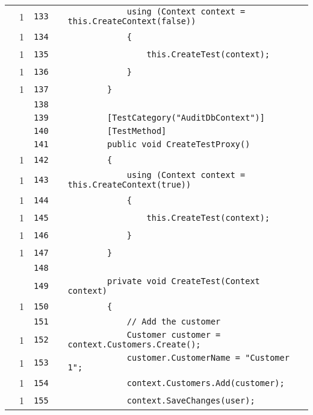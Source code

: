 \documentclass[a4paper,10pt]{article}
\begin{document}
\begin{longtable}[l]{lrrll}
\cellcolor{green} & 1 & \verb~133~ & & \verb~            using (Context context = this.CreateContext(false))~\\
\cellcolor{green} & 1 & \verb~134~ & & \verb~            {~\\
\cellcolor{green} & 1 & \verb~135~ & & \verb~                this.CreateTest(context);~\\
\cellcolor{green} & 1 & \verb~136~ & & \verb~            }~\\
\cellcolor{green} & 1 & \verb~137~ & & \verb~        }~\\
\cellcolor{gray} &  & \verb~138~ & & \verb~~\\
\cellcolor{gray} &  & \verb~139~ & & \verb~        [TestCategory("AuditDbContext")]~\\
\cellcolor{gray} &  & \verb~140~ & & \verb~        [TestMethod]~\\
\cellcolor{gray} &  & \verb~141~ & & \verb~        public void CreateTestProxy()~\\
\cellcolor{green} & 1 & \verb~142~ & & \verb~        {~\\
\cellcolor{green} & 1 & \verb~143~ & & \verb~            using (Context context = this.CreateContext(true))~\\
\cellcolor{green} & 1 & \verb~144~ & & \verb~            {~\\
\cellcolor{green} & 1 & \verb~145~ & & \verb~                this.CreateTest(context);~\\
\cellcolor{green} & 1 & \verb~146~ & & \verb~            }~\\
\cellcolor{green} & 1 & \verb~147~ & & \verb~        }~\\
\cellcolor{gray} &  & \verb~148~ & & \verb~~\\
\cellcolor{gray} &  & \verb~149~ & & \verb~        private void CreateTest(Context context)~\\
\cellcolor{green} & 1 & \verb~150~ & & \verb~        {~\\
\cellcolor{gray} &  & \verb~151~ & & \verb~            // Add the customer~\\
\cellcolor{green} & 1 & \verb~152~ & & \verb~            Customer customer = context.Customers.Create();~\\
\cellcolor{green} & 1 & \verb~153~ & & \verb~            customer.CustomerName = "Customer 1";~\\
\cellcolor{green} & 1 & \verb~154~ & & \verb~            context.Customers.Add(customer);~\\
\cellcolor{green} & 1 & \verb~155~ & & \verb~            context.SaveChanges(user);~\\

\end{longtable}
\end{document}

